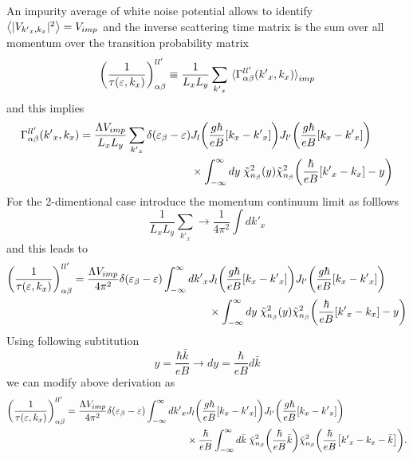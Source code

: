 \noindent
An impurity average of white noise potential allows to identify $\expval{|V_{{k'}_x,k_x}|^2} = V_{imp}$ and the inverse scattering time matrix is the sum over all momentum over the transition probability matrix
\begin{equation} \label{4.59}
    \qty(\frac{1}{\tau(\varepsilon,k_x)})^{ll'}_{\alpha\beta} \equiv
    \frac{1}{L_x L_y} \sum_{{k'}_x}
    \expval**{\Gamma_{\alpha\beta}^{ll'}({k'}_x,k_x)}_{imp}
\end{equation}
and this implies
\begin{equation} \label{4.60}
  \begin{aligned}
    \Gamma_{\alpha\beta}^{ll'}({k'}_x,k_x) =
    \frac{\Lambda V_{imp}}{L_x L_y} \sum_{{k'}_x}
    \delta(\varepsilon_{\beta} - \varepsilon) &
    J_l\qty(\frac{g\hbar}{eB}[{k}_x - {k'}_x])
    J_{l'}\qty(\frac{g\hbar}{eB}[{k}_x - {k'}_x]) \\
    & \times
    \int_{-\infty}^{\infty} dy \;
    \tilde{\chi}^2_{n_{\beta}}\qty(y)
    \tilde{\chi}^2_{n_{\beta}}\qty(\frac{\hbar}{eB} \qty[{k'}_x - {k}_x] - y)
  \end{aligned}
\end{equation}
For the 2-dimentional case introduce the momentum continuum limit as folllows
\begin{equation} \label{4.61}
    \frac{1}{L_x L_y} \sum_{{k'}_x} \longrightarrow
    \frac{1}{4\pi^2}\int d {k'}_x
\end{equation}
and this leads to
\begin{equation} \label{4.62}
  \begin{aligned}
    \qty(\frac{1}{\tau(\varepsilon,k_x)})^{ll'}_{\alpha\beta} =
    \frac{\Lambda V_{imp}}{4\pi^2}
    \delta(\varepsilon_{\beta} - \varepsilon)
    \int_{-\infty}^{\infty} d {k'}_x
    &
    J_l\qty(\frac{g\hbar}{eB}[{k}_x - {k'}_x])
    J_{l'}\qty(\frac{g\hbar}{eB}[{k}_x - {k'}_x]) \\
    & \times
    \int_{-\infty}^{\infty} dy \;
    \tilde{\chi}^2_{n_{\beta}}\qty(y)
    \tilde{\chi}^2_{n_{\beta}}\qty(\frac{\hbar}{eB} \qty[{k'}_x - {k}_x] - y)
  \end{aligned}
\end{equation}
Using following subtitution
\begin{equation} \label{4.63}
    y = \frac{\hbar \bar{k}}{eB} \longrightarrow
    dy = \frac{\hbar }{eB} d\bar{k}
\end{equation}
we can modify above derivation as
\begin{equation} \label{4.64}
  \begin{aligned}
    \qty(\frac{1}{\tau(\varepsilon,k_x)})^{ll'}_{\alpha\beta} =
    \frac{\Lambda V_{imp}}{4\pi^2}
    \delta(\varepsilon_{\beta} - \varepsilon)
    \int_{-\infty}^{\infty} d {k'}_x
    &
    J_l\qty(\frac{g\hbar}{eB}[{k}_x - {k'}_x])
    J_{l'}\qty(\frac{g\hbar}{eB}[{k}_x - {k'}_x]) \\
    & \times
    \frac{\hbar }{eB}
    \int_{-\infty}^{\infty} d\bar{k} \;
    \tilde{\chi}^2_{n_{\beta}}\qty(\frac{\hbar}{eB}\bar{k})
    \tilde{\chi}^2_{n_{\beta}}\qty(\frac{\hbar}{eB} \qty[{k'}_x - {k}_x - \bar{k}]).
  \end{aligned}
\end{equation}

